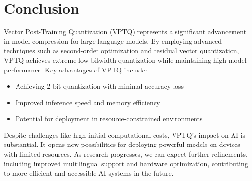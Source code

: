 \documentclass{article}
\begin{document}
\section{Conclusion}
Vector Post-Training Quantization (VPTQ) represents a significant advancement in model compression for large language models. By employing advanced techniques such as second-order optimization and residual vector quantization, VPTQ achieves extreme low-bitwidth quantization while maintaining high model performance.
Key advantages of VPTQ include:
\begin{itemize}
\item Achieving 2-bit quantization with minimal accuracy loss
\item Improved inference speed and memory efficiency
\item Potential for deployment in resource-constrained environments
\end{itemize}
Despite challenges like high initial computational costs, VPTQ's impact on AI is substantial. It opens new possibilities for deploying powerful models on devices with limited resources. As research progresses, we can expect further refinements, including improved multilingual support and hardware optimization, contributing to more efficient and accessible AI systems in the future.
\end{document}
